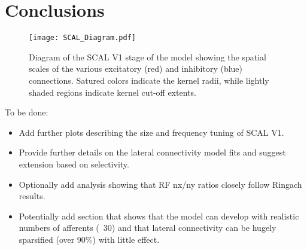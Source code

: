 \section{Conclusions}

\begin{figure}
	\centering
        \texttt{[image: SCAL\_Diagram.pdf]}
	\caption{Diagram of the SCAL V1 stage of the model showing
          the spatial scales of the various excitatory (red) and
          inhibitory (blue) connections. Satured colors indicate the
          kernel radii, while lightly shaded regions indicate kernel
          cut-off extents.}
	\label{SCALDiagram}
\end{figure}


To be done:

\begin{itemize}
  \item Add further plots describing the size and frequency tuning of SCAL V1.
  \item Provide further details on the lateral connectivity model fits and suggest extension based on selectivity.
  \item Optionally add analysis showing that RF nx/ny ratios closely
    follow Ringach results.
  \item Potentially add section that shows that the model can develop with realistic numbers of afferents (~30) and that lateral connectivity can be hugely sparsified (over 90\%) with little effect.
\end{itemize}
